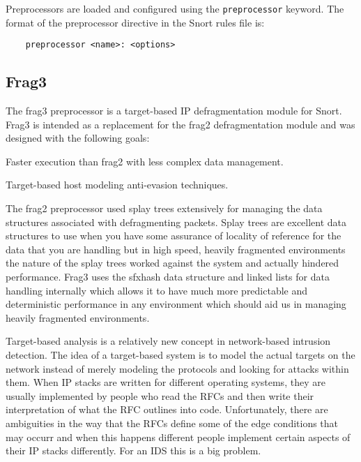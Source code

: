 \documentclass[english]{report}
\newcounter{slistnum}
\newenvironment{slist}
{ \begin{list}{ {\bf \arabic{slistnum}.} }{\usecounter{slistnum} } }
{ \end{list} }
\begin{document}
Preprocessors are loaded and configured using the {\tt preprocessor} keyword.
The format of the preprocessor directive in the Snort rules file is:

\begin{verbatim}
    preprocessor <name>: <options>
\end{verbatim}

\subsection{Frag3}
\label{frag3 section}

The frag3 preprocessor is a target-based IP defragmentation module for Snort.
Frag3 is intended as a replacement for the frag2 defragmentation module and was
designed with the following goals:

\begin{slist}
\item Faster execution than frag2 with less complex data management.
\item Target-based host modeling anti-evasion techniques.
\end{slist}

The frag2 preprocessor used splay trees extensively for managing the data
structures associated with defragmenting packets.  Splay trees are excellent
data structures to use when you have some assurance of locality of reference
for the data that you are handling but in high speed, heavily fragmented
environments the nature of the splay trees worked against the system and
actually hindered performance.  Frag3 uses the sfxhash data structure and
linked lists for data handling internally which allows it to have much more
predictable and deterministic performance in any environment which should aid
us in managing heavily fragmented environments.

Target-based analysis is a relatively new concept in network-based intrusion
detection.  The idea of a target-based system is to model the actual targets on
the network instead of merely modeling the protocols and looking for attacks
within them.  When IP stacks are written for different operating systems, they
are usually implemented by people who read the RFCs and then write their
interpretation of what the RFC outlines into code.  Unfortunately, there are
ambiguities in the way that the RFCs define some of the edge conditions that
may occurr and when this happens different people implement certain aspects of
their IP stacks differently.  For an IDS this is a big problem.
\end{document}
